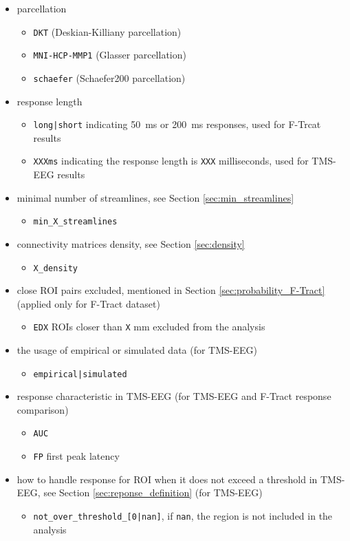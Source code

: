 \begin{itemize}
    \item parcellation
    \begin{itemize}
        \item \texttt{DKT} (Deskian-Killiany parcellation)
        \item \texttt{MNI-HCP-MMP1} (Glasser parcellation)
        \item \texttt{schaefer} (Schaefer200 parcellation)
    \end{itemize}
    \item response length
    \begin{itemize}
        \item \texttt{long|short} indicating 50~ms or 200~ms responses, used for F-Trcat results
        \item \texttt{XXXms} indicating the response length is \texttt{XXX} milliseconds, used for TMS-EEG results
    \end{itemize}
    \item minimal number of streamlines, see Section \ref{sec:min_streamlines}
    \begin{itemize}
        \item \texttt{min\_X\_streamlines}
    \end{itemize}
    \item connectivity matrices density, see Section \ref{sec:density}
    \begin{itemize}
        \item \texttt{X\_density} 
    \end{itemize}
    \item close ROI pairs excluded, mentioned in Section \ref{sec:probability_F-Tract} (applied only for F-Tract dataset)
    \begin{itemize}
        \item \texttt{EDX} ROIs closer than \texttt{X} mm excluded from the analysis 
    \end{itemize}
    \item the usage of empirical or simulated data (for TMS-EEG)
    \begin{itemize}
        \item \texttt{empirical|simulated} 
    \end{itemize} 
    \item response characteristic in TMS-EEG (for TMS-EEG and F-Tract response comparison)
    \begin{itemize}
        \item \texttt{AUC} 
        \item \texttt{FP} first peak latency 
    \end{itemize} 
    \item how to handle response for ROI when it does not exceed a threshold in TMS-EEG, see Section \ref{sec:reponse_definition} (for TMS-EEG)
    \begin{itemize}
        \item \texttt{not\_over\_threshold\_[0|nan]}, if \texttt{nan}, the region is not included in the analysis
    \end{itemize} 
\end{itemize}